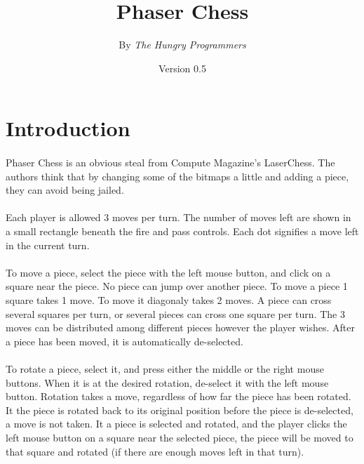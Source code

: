 \newcommand{\postscript}[2]
 {\setlength{\epsfxsize}{#2\hsize}
  \centerline{\epsfbox{#1}}}



\title{Phaser Chess}
\author{By \em The Hungry Programmers}
\date{Version 0.5}
\maketitle

\noindent

\setcounter{chapter}{1}

\section*{Introduction}
\paragraph[]{}
Phaser Chess is an obvious steal from Compute Magazine's LaserChess.
The authors think that by changing some of the bitmaps a little and
adding a piece, they can avoid being jailed.

\paragraph[]{}
Each player is allowed 3 moves per turn.  The number of moves left are
shown in a small rectangle beneath the fire and pass controls.  Each
dot signifies a move left in the current turn.

\paragraph[]{}
To move a piece, select the piece with the left mouse button, and
click on a square near the piece.  No piece can jump over another
piece.  To move a piece 1 square takes 1 move.  To move it diagonaly
takes 2 moves.  A piece can cross several squares per turn, or several
pieces can cross one square per turn.  The 3 moves can be distributed
among different pieces however the player wishes.  After a piece has
been moved, it is automatically de-selected.

\paragraph[]{}
To rotate a piece, select it, and press either the middle or the right
mouse buttons.  When it is at the desired rotation, de-select it with
the left mouse button.  Rotation takes a move, regardless of how far
the piece has been rotated.  It the piece is rotated back to its
original position before the piece is de-selected, a move is not
taken.  It a piece is selected and rotated, and the player clicks the
left mouse button on a square near the selected piece, the piece will
be moved to that square and rotated (if there are enough moves left in
that turn).


